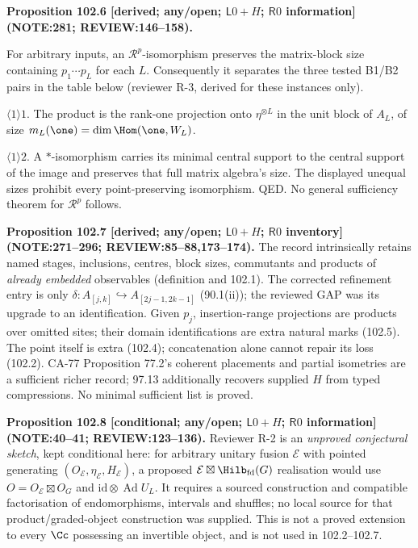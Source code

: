 \textbf{Proposition 102.6 [derived; any/open; \(\mathsf L0+H\); \(\mathsf R0\) information]\newline (NOTE:281; REVIEW:146--158).}\par
For arbitrary inputs, an \(\mathcal R^p\)-isomorphism preserves the matrix-block size containing
\(p_1\cdots p_L\) for each \(L\). Consequently it separates the three tested B1/B2 pairs in the table below
(reviewer R-3, derived for these instances only).
\par\(\langle1\rangle1\). The product is the rank-one projection onto \(\eta^{\otimes L}\)
in the unit block of \(A_L\), of size \(m_L(\one)=\dim\Hom(\one,W_L)\).
\par\(\langle1\rangle2\). A \(*\)-isomorphism carries its minimal central support to the central support
of the image and preserves that full matrix algebra's size. The displayed unequal sizes prohibit every
point-preserving isomorphism. QED. No general sufficiency theorem for \(\mathcal R^p\) follows.

\textbf{Proposition 102.7 [derived; any/open; \(\mathsf L0+H\); \(\mathsf R0\) inventory]\newline (NOTE:271--296; REVIEW:85--88,173--174).}
The record intrinsically retains named stages, inclusions, centres, block sizes, commutants and products of
\emph{already embedded} observables (definition and 102.1). The corrected refinement entry is only
\(\delta:A_{[j,k]}\hookrightarrow A_{[2j-1,2k-1]}\) (90.1(ii)); the reviewed GAP was its upgrade to an identification.
Given \(p_j\), insertion-range projections are products over omitted sites; their domain identifications are
extra natural marks (102.5). The point itself is extra (102.4); concatenation alone cannot repair its loss (102.2).
CA-77 Proposition 77.2's coherent placements and partial isometries are a sufficient richer record;
97.13 additionally recovers supplied \(H\) from typed compressions. No minimal sufficient list is proved.

\textbf{Proposition 102.8 [conditional; any/open; \(\mathsf L0+H\); \(\mathsf R0\) information]\newline (NOTE:40--41; REVIEW:123--136).}
Reviewer R-2 is an \emph{unproved conjectural sketch}, kept conditional here: for arbitrary unitary fusion
\(\mathcal E\) with pointed generating \((O_{\mathcal E},\eta_{\mathcal E},H_{\mathcal E})\), a proposed
\(\mathcal E\boxtimes\Hilb_{\mathrm{fd}}(G)\) realisation would use
\(O=O_{\mathcal E}\boxtimes O_G\) and \(\mathrm{id}\otimes\operatorname{Ad}U_L\).
It requires a sourced construction and compatible factorisation of endomorphisms, intervals and shuffles;
no local source for that product/graded-object construction was supplied. This is not a proved extension
to every \(\Cc\) possessing an invertible object, and is not used in 102.2--102.7.

